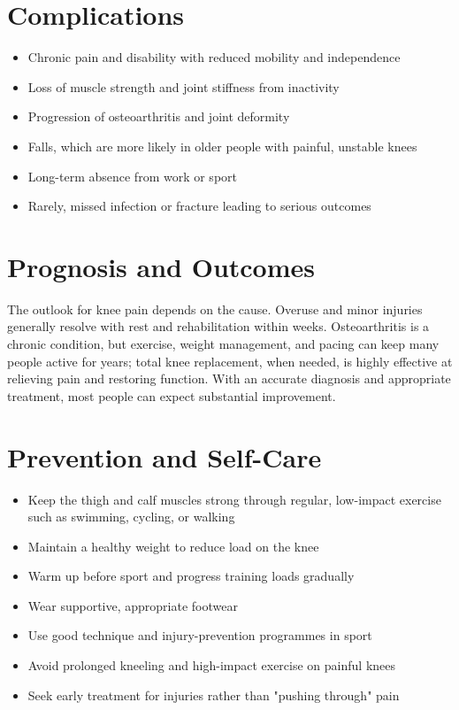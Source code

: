 \section*{Complications}
\begin{itemize}
    \item Chronic pain and disability with reduced mobility and independence
    \item Loss of muscle strength and joint stiffness from inactivity
    \item Progression of osteoarthritis and joint deformity
    \item Falls, which are more likely in older people with painful, unstable knees
    \item Long-term absence from work or sport
    \item Rarely, missed infection or fracture leading to serious outcomes
\end{itemize}

\section*{Prognosis and Outcomes}
The outlook for knee pain depends on the cause. Overuse and minor injuries generally resolve with rest and rehabilitation within weeks. Osteoarthritis is a chronic condition, but exercise, weight management, and pacing can keep many people active for years; total knee replacement, when needed, is highly effective at relieving pain and restoring function. With an accurate diagnosis and appropriate treatment, most people can expect substantial improvement.

\section*{Prevention and Self-Care}
\begin{itemize}
    \item Keep the thigh and calf muscles strong through regular, low-impact exercise such as swimming, cycling, or walking
    \item Maintain a healthy weight to reduce load on the knee
    \item Warm up before sport and progress training loads gradually
    \item Wear supportive, appropriate footwear
    \item Use good technique and injury-prevention programmes in sport
    \item Avoid prolonged kneeling and high-impact exercise on painful knees
    \item Seek early treatment for injuries rather than "pushing through" pain
\end{itemize}

